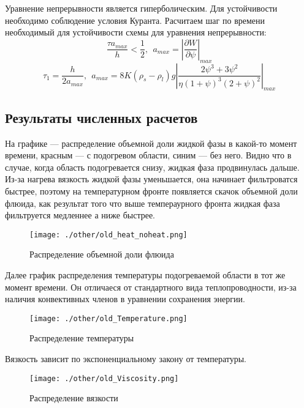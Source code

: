 \documentclass[12pt,a4paper]{article}
\newcommand{\pd}[2]{\frac{\partial #1}{\partial #2}}
\begin{document}
Уравнение непрерывности является гиперболическим. Для устойчивости необходимо соблюдение условия Куранта. Расчитаем шаг по времени необходимый для устойчивости схемы для уравнения непрерывности:
$$
\frac{\tau a_{max}}{h} < \frac12 ,\ \ a_{max} = \left|\pd{W}{\psi}\right|_{max}
$$
$$
\tau_1 = \frac{h}{2 a_{max}},\ \  a_{max} = 8 K (\rho_s - \rho_l)g\left|\frac{2\psi^3 + 3\psi^2}{\eta(1 + \psi)^3(2+\psi)^2}\right|_{max}
$$

\subsection{Результаты численных расчетов}
На графике --- распределение объемной доли жидкой фазы в какой-то момент времени, красным --- с подогревом области, синим --- без него. Видно что в случае, когда область подогревается снизу, жидкая фаза продвинулась дальше. Из-за нагрева вязкость жидкой фазы уменьшается, она начинает фильтроватся быстрее, поэтому на температурном фронте появляется скачок объемной доли флюида, как результат того что выше темпераурного фронта жидкая фаза фильтруется медленнее а ниже быстрее. 

\begin{figure}[ht!]
\begin{center}
\texttt{[image: ./other/old\_heat\_noheat.png]}
\caption{Распределение объемной доли флюида}
\end{center}
\end{figure}

Далее график распределения температуры подогреваемой области в тот же момент времени. Он отличаеся от стандартного вида теплопроводности, из-за наличия конвективных членов в уравнении сохранения энергии.
\newpage
\begin{figure}[ht!]
\begin{center}
\texttt{[image: ./other/old\_Temperature.png]}
\caption{Распределение температуры}
\end{center}
\end{figure}

Вязкость зависит по экспоненциальному закону от температуры.

\begin{figure}[ht!]
\begin{center}
\texttt{[image: ./other/old\_Viscosity.png]}
\caption{Распределение вязкости}
\end{center}
\end{figure}
\newpage
\end{document}
